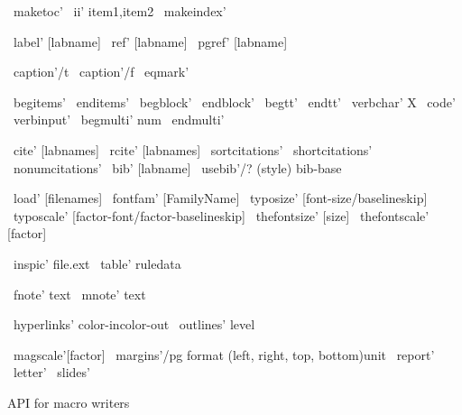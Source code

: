{~maketoc'         %
~ii' item1,item2  %
~makeindex'       %

~label' [labname]  %
~ref' [labname]    %
~pgref' [labname]  %

~caption'/t  %
~caption'/f  %
~eqmark'     %

~begitems'       %
~enditems'       %
~begblock'       %
~endblock'       %
~begtt'          %
~endtt'          %
~verbchar' X     %
~code'           %
~verbinput'      %
~begmulti' num   %
~endmulti'       %

~cite' [labnames]  %
~rcite' [labnames] %
~sortcitations' ~shortcitations' ~nonumcitations' %
~bib' [labname]  %
~usebib'/? (style) bib-base %

~load' [filenames]     %
~fontfam' [FamilyName] %
~typosize' [font-size/baselineskip] %
~typoscale' [factor-font/factor-baselineskip] %
~thefontsize' [size] ~thefontscale' [factor]   %

~inspic' file.ext    %
~table' {rule}{data} %

~fnote' {text}   %
~mnote' {text}   %

~hyperlinks' {color-in}{color-out} %
~outlines' {level}   %

~magscale'[factor]  %
~margins'/pg format (left, right, top, bottom)unit %
~report' ~letter' ~slides'  %
\endtt

\sec API for macro writers

}
